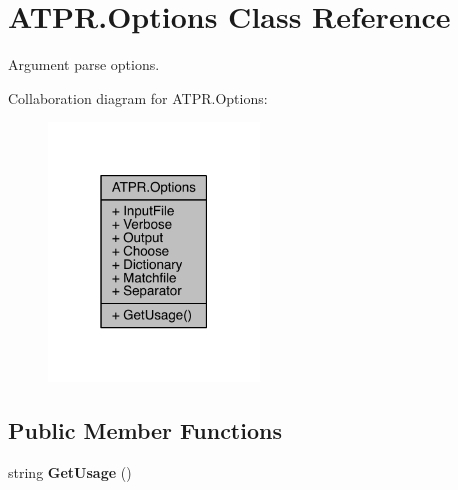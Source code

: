 \hypertarget{class_a_t_p_r_1_1_options}{}\section{A\+T\+P\+R.\+Options Class Reference}
\label{class_a_t_p_r_1_1_options}


Argument parse options.  




Collaboration diagram for A\+T\+P\+R.\+Options\+:
\nopagebreak
\begin{figure}[H]
\begin{center}
\leavevmode
\includegraphics[width=159pt]{d4/dc3/class_a_t_p_r_1_1_options__coll__graph}
\end{center}
\end{figure}
\subsection*{Public Member Functions}
\begin{DoxyCompactItemize}
\item 
\hypertarget{class_a_t_p_r_1_1_options_a92883d4a7564f235412e41e6724c32b2}{}\label{class_a_t_p_r_1_1_options_a92883d4a7564f235412e41e6724c32b2} 
string {\bfseries Get\+Usage} ()
\end{DoxyCompactItemize}
